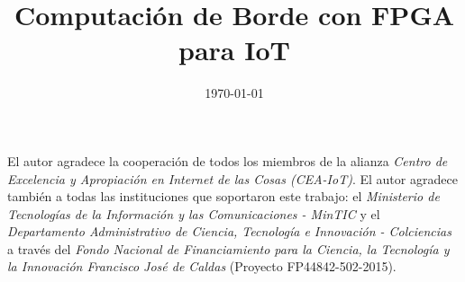 \documentclass[11pt, openright]{Thesis}      %
\begin{document}
\frontmatter	  %


\title  {Computación de Borde con FPGA para IoT}
\addresses  {\degreename\\\univname\\\deptname\\\groupname}  %
\date       {\today}
\subject    {}

\maketitle 







\pagestyle{fancy}  %

\tableofcontents  %

\listoffigures  %

\listoftables  %

\acknowledgements
{
El autor agradece la cooperación de todos los miembros de la alianza \textit{Centro de Excelencia y Apropiaci\'{o}n en Internet de las Cosas (CEA-IoT)}. El autor agradece también a todas las instituciones que soportaron este trabajo: el \textit{Ministerio de Tecnolog\'{i}as de la Informaci\'{o}n y las Comunicaciones - MinTIC} y el \textit{Departamento Administrativo de Ciencia, Tecnolog\'{i}a e Innovaci\'{o}n - Colciencias} a través del \textit{Fondo Nacional de Financiamiento para la Ciencia, la Tecnolog\'{i}a y la Innovaci\'{o}n Francisco Jos\'{e} de Caldas} (Proyecto FP44842-502-2015).
}
\end{document}
